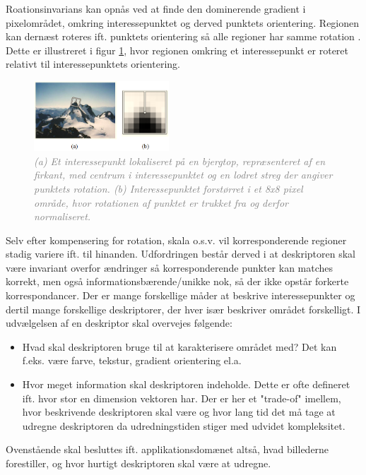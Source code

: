 Roationsinvarians kan opnås ved at finde den dominerende gradient i pixelområdet, omkring interessepunktet og derved punktets orientering. Regionen kan dernæst roteres ift. punktets orientering så alle regioner har samme rotation \cite{bjerg}. Dette er illustreret i figur \ref{fig:bjerg}, hvor regionen omkring et interessepunkt er roteret relativt til interessepunktets orientering.
\begin{figure}[H]
    \centering
    \includegraphics[width=0.45\textwidth]{fig/21.png}
    \vspace{-0.5em} 
    \begin{center}
    \caption{\textcolor{gray}{\footnotesize \textit{
   (a) Et interessepunkt lokaliseret på en bjergtop,  repræsenteret af en firkant, med centrum i interessepunktet og en lodret streg der angiver punktets rotation. (b) Interessepunktet forstørret i et 8x8 pixel område, hvor rotationen af punktet er trukket fra og derfor normaliseret.}}}
    \label{fig:bjerg}
     \end{center}
  \end{figure}
       \vspace{-2.5em}
\noindent
Selv efter kompensering for rotation, skala o.s.v. vil korresponderende regioner stadig variere ift. til hinanden. Udfordringen består derved i at deskriptoren skal være invariant overfor ændringer så korresponderende punkter kan matches korrekt, men også informationsbærende/unikke nok, så der ikke opstår forkerte korrespondancer. Der er mange forskellige måder at beskrive interessepunkter og dertil mange forskellige deskriptorer, der hver især beskriver området forskelligt. I udvælgelsen af en deskriptor skal overvejes følgende:
\begin{itemize}
\item{Hvad skal deskriptoren bruge til at karakterisere området med? Det kan f.eks. være farve, tekstur, gradient orientering el.a.}
\item{Hvor meget information skal deskriptoren indeholde. Dette er ofte defineret ift. hvor stor en dimension vektoren har. Der er her et "trade-of" imellem, hvor beskrivende deskriptoren skal være og hvor lang tid det må tage at udregne deskriptoren da udredningstiden stiger med udvidet kompleksitet.}
\end{itemize}
Ovenstående skal besluttes ift. applikationsdomænet altså, hvad billederne forestiller, og hvor hurtigt deskriptoren skal være at udregne.
